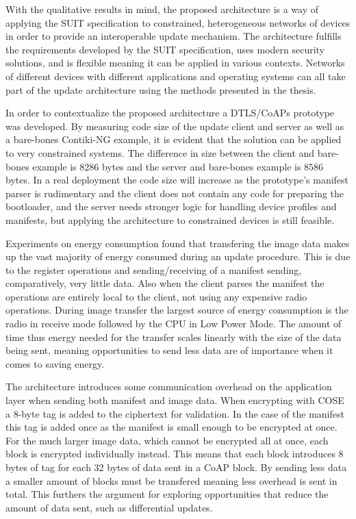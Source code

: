 \documentclass[0-thesis.tex]{subfiles}
\begin{document}
With the qualitative results in mind, the proposed architecture is a way of applying the
SUIT specification to constrained, heterogeneous networks of devices in order to provide
an interoperable update mechanism. The architecture fulfills the requirements developed by
the SUIT specification, uses modern security solutions, and is flexible meaning it can be
applied in various contexts. Networks of different devices with different applications and
operating systems can all take part of the update architecture using the methods presented
in the thesis.

In order to contextualize the proposed architecture a DTLS/CoAPs prototype was developed.
By measuring code size of the update client and server as well as a bare-bones Contiki-NG
example, it is evident that the solution can be applied to very constrained systems. The
difference in size between the client and bare-bones example is 8286 bytes and the server
and bare-bones example is 8586 bytes. In a real deployment the code size will increase as
the prototype's manifest parser is rudimentary and the client does not contain any code
for preparing the bootloader, and the server needs stronger logic for handling device
profiles and manifests, but applying the architecture to constrained devices is still
feasible.

Experiments on energy consumption found that transfering the image data makes up the vast
majority of energy consumed during an update procedure. This is due to the register
operations and sending/receiving of a manifest sending, comparatively, very little data.
Also when the client parses the manifest the operations are entirely local to the client,
not using any expensive radio operations. During image transfer the largest source of
energy consumption is the radio in receive mode followed by the CPU in Low Power Mode. The
amount of time thus energy needed for the transfer scales linearly with the size of the
data being sent, meaning opportunities to send less data are of importance when it comes
to saving energy.

The architecture introduces some communication overhead on the application layer when
sending both manifest and image data. When encrypting with COSE a 8-byte tag is added to
the ciphertext for validation. In the case of the manifest this tag is added once as the
manifest is small enough to be encrypted at once. For the much larger image data, which
cannot be encrypted all at once, each block is encrypted individually instead. This means
that each block introduces 8 bytes of tag for each 32 bytes of data sent in a CoAP block.
By sending less data a smaller amount of blocks must be transfered meaning less overhead
is sent in total. This furthers the argument for exploring opportunities that reduce the
amount of data sent, such as differential updates.
\end{document}
